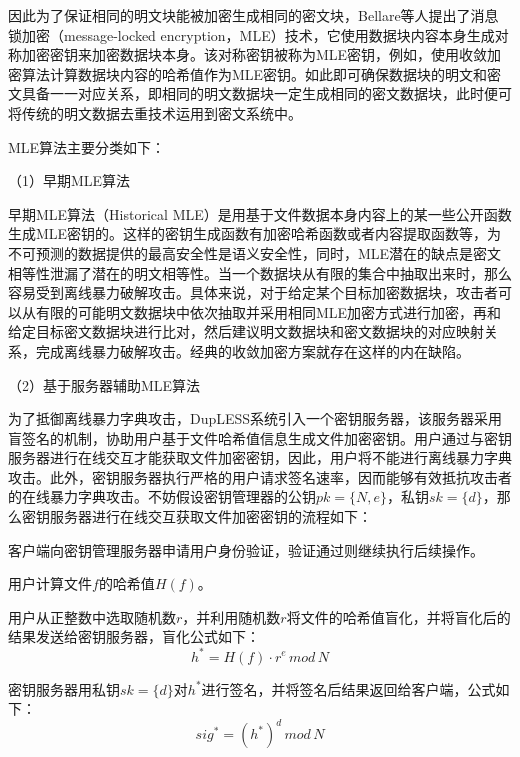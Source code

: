 \documentclass[promaster]{thesis-uestc}
\begin{document}
因此为了保证相同的明文块能被加密生成相同的密文块，Bellare等人提出了消息锁加密（message-locked encryption，MLE）技术，它使用数据块内容本身生成对称加密密钥来加密数据块本身。该对称密钥被称为MLE密钥，例如，使用收敛加密算法计算数据块内容的哈希值作为MLE密钥。如此即可确保数据块的明文和密文具备一一对应关系，即相同的明文数据块一定生成相同的密文数据块，此时便可将传统的明文数据去重技术运用到密文系统中。

MLE算法主要分类如下：

（1）早期MLE算法

早期MLE算法（Historical MLE）是用基于文件数据本身内容上的某一些公开函数生成MLE密钥的。这样的密钥生成函数有加密哈希函数或者内容提取函数等，为不可预测的数据提供的最高安全性是语义安全性，同时，MLE潜在的缺点是密文相等性泄漏了潜在的明文相等性。当一个数据块从有限的集合中抽取出来时，那么容易受到离线暴力破解攻击。具体来说，对于给定某个目标加密数据块，攻击者可以从有限的可能明文数据块中依次抽取并采用相同MLE加密方式进行加密，再和给定目标密文数据块进行比对，然后建议明文数据块和密文数据块的对应映射关系，完成离线暴力破解攻击。经典的收敛加密方案就存在这样的内在缺陷。

（2）基于服务器辅助MLE算法\label{RSA盲签名}

为了抵御离线暴力字典攻击，DupLESS系统引入一个密钥服务器，该服务器采用盲签名的机制，协助用户基于文件哈希值信息生成文件加密密钥。用户通过与密钥服务器进行在线交互才能获取文件加密密钥，因此，用户将不能进行离线暴力字典攻击。此外，密钥服务器执行严格的用户请求签名速率，因而能够有效抵抗攻击者的在线暴力字典攻击。不妨假设密钥管理器的公钥$pk = \{N, e\}$，私钥$sk=\{d\}$，那么密钥服务器进行在线交互获取文件加密密钥的流程如下：

客户端向密钥管理服务器申请用户身份验证，验证通过则继续执行后续操作。

用户计算文件$f$的哈希值$H(f)$。

用户从正整数中选取随机数$r$，并利用随机数$r$将文件的哈希值盲化，并将盲化后的结果发送给密钥服务器，盲化公式如下：
\begin{equation}
    h^* = H(f) \cdot r^e\, mod\, N
\end{equation}

密钥服务器用私钥$sk = \{d\}$对$h^*$进行签名，并将签名后结果返回给客户端，公式如下：
\begin{equation}
    sig^* = (h^*)^d\,mod\,N
\end{equation}
\end{document}
